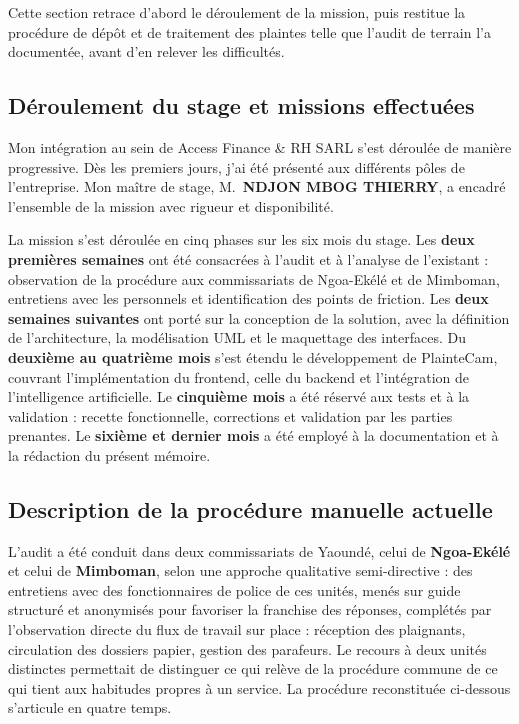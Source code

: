 Cette section retrace d'abord le déroulement de la mission, puis restitue la procédure de dépôt et de traitement des plaintes telle que l'audit de terrain l'a documentée, avant d'en relever les difficultés.

\subsection{Déroulement du stage et missions effectuées}

Mon intégration au sein de Access Finance \& RH SARL s'est déroulée de manière progressive. Dès les premiers jours, j'ai été présenté aux différents pôles de l'entreprise. Mon maître de stage, M.~\textbf{NDJON MBOG THIERRY}, a encadré l'ensemble de la mission avec rigueur et disponibilité.

La mission s'est déroulée en cinq phases sur les six mois du stage. Les \textbf{deux premières semaines} ont été consacrées à l'audit et à l'analyse de l'existant : observation de la procédure aux commissariats de Ngoa-Ekélé et de Mimboman, entretiens avec les personnels et identification des points de friction. Les \textbf{deux semaines suivantes} ont porté sur la conception de la solution, avec la définition de l'architecture, la modélisation UML et le maquettage des interfaces. Du \textbf{deuxième au quatrième mois} s'est étendu le développement de PlainteCam, couvrant l'implémentation du frontend, celle du backend et l'intégration de l'intelligence artificielle. Le \textbf{cinquième mois} a été réservé aux tests et à la validation : recette fonctionnelle, corrections et validation par les parties prenantes. Le \textbf{sixième et dernier mois} a été employé à la documentation et à la rédaction du présent mémoire.

\subsection{Description de la procédure manuelle actuelle}

L'audit a été conduit dans deux commissariats de Yaoundé, celui de \textbf{Ngoa-Ekélé} et celui de \textbf{Mimboman}, selon une approche qualitative semi-directive : des entretiens avec des fonctionnaires de police de ces unités, menés sur guide structuré et anonymisés pour favoriser la franchise des réponses, complétés par l'observation directe du flux de travail sur place : réception des plaignants, circulation des dossiers papier, gestion des parafeurs. Le recours à deux unités distinctes permettait de distinguer ce qui relève de la procédure commune de ce qui tient aux habitudes propres à un service. La procédure reconstituée ci-dessous s'articule en quatre temps.

